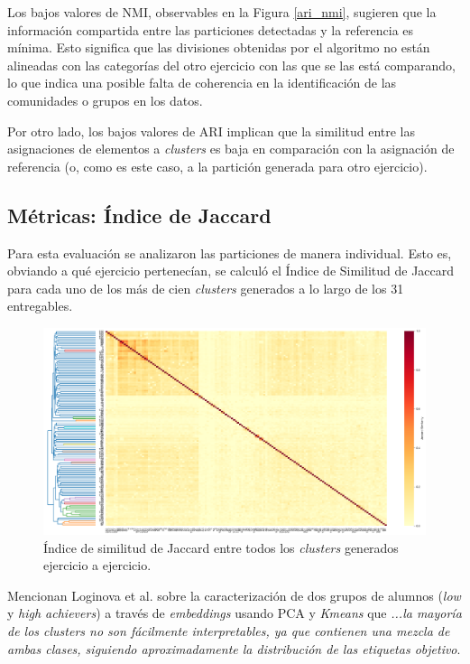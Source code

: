 \documentclass[11pt,a4paper,twoside,openany]{tesis}
\begin{document}
Los bajos valores de NMI, observables en la Figura \ref{ari_nmi}, sugieren que la información compartida entre las particiones detectadas y la referencia es mínima. Esto significa que las divisiones obtenidas por el algoritmo no están alineadas con las categorías del otro ejercicio con las que se las está comparando, lo que indica una posible falta de coherencia en la identificación de las comunidades o grupos en los datos.

Por otro lado, los bajos valores de ARI implican que la similitud entre las asignaciones de elementos a \emph{clusters} es baja en comparación con la asignación de referencia (o, como es este caso, a la partición generada para otro ejercicio).

\subsection{Métricas: Índice de Jaccard}
Para esta evaluación se analizaron las particiones de manera individual. Esto es, obviando a qué ejercicio pertenecían, se calculó el Índice de Similitud de Jaccard \cite{jaccard} para cada uno de los más de cien \emph{clusters} generados a lo largo de los 31 entregables.
\newpage

\begin{figure}[H]
    \centering
    \includegraphics[width=1\textwidth]{imagenes/clusterxcluster.png}
    \caption{Índice de similitud de Jaccard entre todos los \emph{clusters} generados ejercicio a ejercicio.}
     \label{jaccard}
\end{figure}


Mencionan Loginova et al. sobre la caracterización de dos grupos de alumnos (\emph{low} y \emph{high achievers}) a través de \emph{embeddings} usando PCA y \emph{Kmeans} que \emph{...la mayoría de los clusters no son fácilmente interpretables, ya que contienen una mezcla de ambas clases, siguiendo aproximadamente la distribución de las etiquetas objetivo}\cite{loginova2021embedding}.
\end{document}
